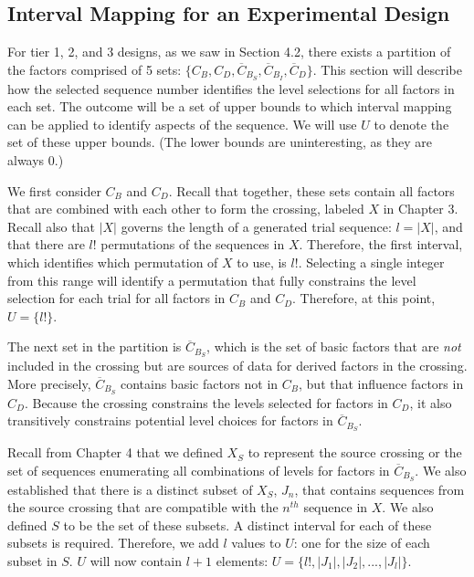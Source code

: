 \subsection{Interval Mapping for an Experimental Design}

For tier 1, 2, and 3 designs, as we saw in Section 4.2, there exists a partition of the factors comprised of 5 sets: $\{C_B, C_D, \overline{C}_{B_S}, \overline{C}_{B_I}, \overline{C}_D\}$. This section will describe how the selected sequence number identifies the level selections for all factors in each set. The outcome will be a set of upper bounds to which interval mapping can be applied to identify aspects of the sequence. We will use $U$ to denote the set of these upper bounds. (The lower bounds are uninteresting, as they are always $0$.)

We first consider $C_B$ and $C_D$. Recall that together, these sets contain all factors that are combined with each other to form the crossing, labeled $X$ in Chapter 3. Recall also that $|X|$ governs the length of a generated trial sequence: $l = |X|$, and that there are $l!$ permutations of the sequences in $X$. Therefore, the first interval, which identifies which permutation of $X$ to use, is $l!$. Selecting a single integer from this range will identify a permutation that fully constrains the level selection for each trial for all factors in $C_B$ and $C_D$. Therefore, at this point, $U = \{l!\}$.

The next set in the partition is $\overline{C}_{B_S}$, which is the set of basic factors that are \textit{not} included in the crossing but are sources of data for derived factors in the crossing. More precisely, $\overline{C}_{B_S}$ contains basic factors not in $C_B$, but that influence factors in $C_D$. Because the crossing constrains the levels selected for factors in $C_D$, it also transitively constrains potential level choices for factors in $\overline{C}_{B_S}$.

Recall from Chapter 4 that we defined $X_S$ to represent the source crossing or the set of sequences enumerating all combinations of levels for factors in $\overline{C}_{B_S}$. We also established that there is a distinct subset of $X_S$, $J_n$, that contains sequences from the source crossing that are compatible with the $n^{th}$ sequence in $X$. We also defined $S$ to be the set of these subsets. A distinct interval for each of these subsets is required. Therefore, we add $l$ values to $U$: one for the size of each subset in $S$. $U$ will now contain $l + 1$ elements: $U = \{l!, |J_1|, |J_2|, ..., |J_l|\}$.

